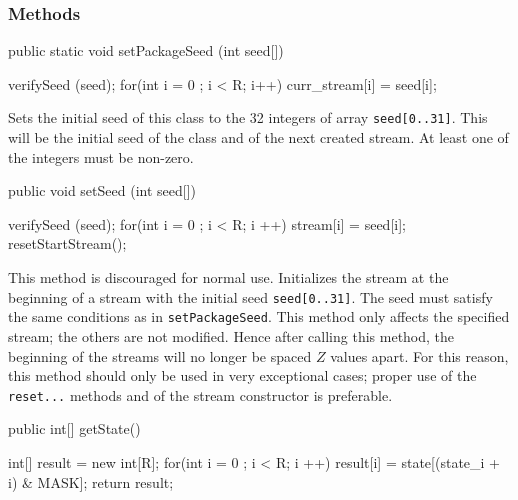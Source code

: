 \subsubsection* {Methods}
\begin{code}
   public static void setPackageSeed (int seed[]) \begin{hide} {
      verifySeed (seed);
      for(int i = 0 ; i < R; i++)
         curr_stream[i] = seed[i];
   } \end{hide}
\end{code}
\begin{tabb} Sets the initial seed of this class to the 32
  integers of array \texttt{seed[0..31]}.
  This will be the initial seed of the class and of the next created stream.
  At least one of the integers must be non-zero.
\end{tabb}
\begin{htmlonly}
\end{htmlonly}
\begin{code}

   public void setSeed (int seed[]) \begin{hide} {
      verifySeed (seed);
      for(int i = 0 ; i <  R; i ++)
         stream[i] = seed[i];
      resetStartStream();
   } \end{hide}
\end{code}
\begin{tabb} This method is discouraged for normal use.
  Initializes the stream at the beginning of a stream with the initial
  seed \texttt{seed[0..31]}. The seed must satisfy the same
  conditions as in \texttt{setPackageSeed}.
  This method only affects the specified stream; the others are not
  modified.  Hence after calling this method, the beginning of the streams
  will no longer be spaced $Z$ values apart.
  For this reason, this method should only be used in very exceptional cases;
  proper use of the \texttt{reset...} methods and of the stream constructor is
  preferable.
\end{tabb}
\begin{htmlonly}
\end{htmlonly}
\begin{code}

   public int[] getState() \begin{hide} {
      int[] result = new int[R];
      for(int i = 0 ; i < R; i ++)
         result[i] = state[(state_i + i) & MASK];
      return result;
   } \end{hide}
\end{code}
